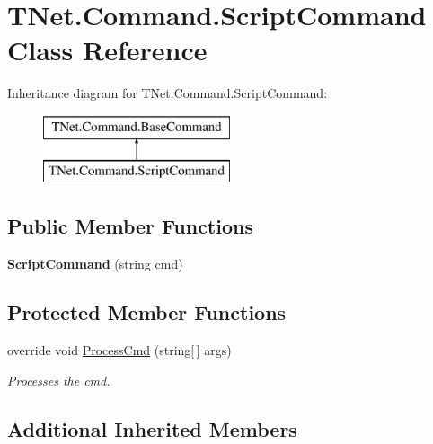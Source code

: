 \hypertarget{class_t_net_1_1_command_1_1_script_command}{}\section{T\+Net.\+Command.\+Script\+Command Class Reference}
\label{class_t_net_1_1_command_1_1_script_command}
Inheritance diagram for T\+Net.\+Command.\+Script\+Command\+:\begin{figure}[H]
\begin{center}
\leavevmode
\includegraphics[height=2.000000cm]{class_t_net_1_1_command_1_1_script_command}
\end{center}
\end{figure}
\subsection*{Public Member Functions}
\begin{DoxyCompactItemize}
\item 
\mbox{\label{class_t_net_1_1_command_1_1_script_command_a02700288c95c54bb2fab2d4ce842f8d5}} 
{\bfseries Script\+Command} (string cmd)
\end{DoxyCompactItemize}
\subsection*{Protected Member Functions}
\begin{DoxyCompactItemize}
\item 
override void \mbox{\hyperlink{class_t_net_1_1_command_1_1_script_command_a69b8d968f851b261e006e233de4ebee0}{Process\+Cmd}} (string\mbox{[}$\,$\mbox{]} args)
\begin{DoxyCompactList}\small\item\em Processes the cmd. \end{DoxyCompactList}\end{DoxyCompactItemize}
\subsection*{Additional Inherited Members}


